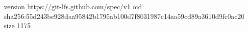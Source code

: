 version https://git-lfs.github.com/spec/v1
oid sha256:55d243bc928daa95842b1795ab100d7f8031987c14aa59cd89a3610d9fc0ac20
size 1175
